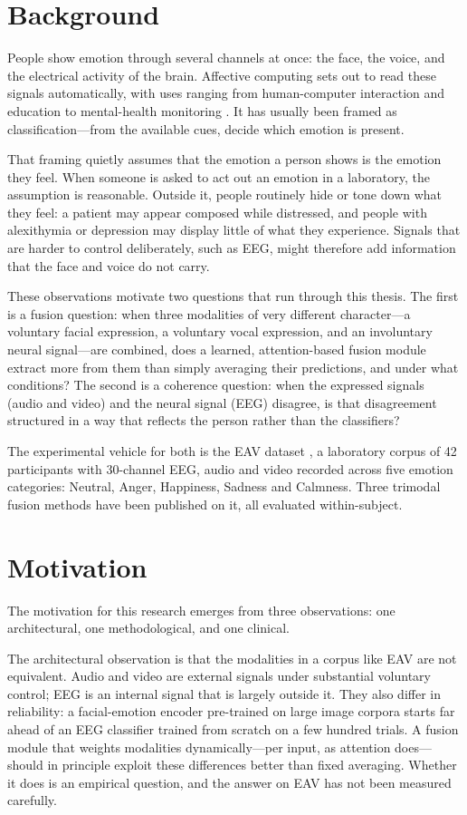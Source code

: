 \section{Background}
People show emotion through several channels at once: the face, the voice, and the electrical activity of the brain. Affective computing sets out to read these signals automatically, with uses ranging from human-computer interaction and education to mental-health monitoring \cite{Picard1997AffectiveComputing}. It has usually been framed as classification---from the available cues, decide which emotion is present.

That framing quietly assumes that the emotion a person shows is the emotion they feel. When someone is asked to act out an emotion in a laboratory, the assumption is reasonable. Outside it, people routinely hide or tone down what they feel: a patient may appear composed while distressed, and people with alexithymia or depression may display little of what they experience. Signals that are harder to control deliberately, such as EEG, might therefore add information that the face and voice do not carry.

These observations motivate two questions that run through this thesis. The first is a fusion question: when three modalities of very different character---a voluntary facial expression, a voluntary vocal expression, and an involuntary neural signal---are combined, does a learned, attention-based fusion module extract more from them than simply averaging their predictions, and under what conditions? The second is a coherence question: when the expressed signals (audio and video) and the neural signal (EEG) disagree, is that disagreement structured in a way that reflects the person rather than the classifiers?

The experimental vehicle for both is the EAV dataset \cite{Lee2024EAV}, a laboratory corpus of 42 participants with 30-channel EEG, audio and video recorded across five emotion categories: Neutral, Anger, Happiness, Sadness and Calmness. Three trimodal fusion methods have been published on it, all evaluated within-subject.

\section{Motivation}
The motivation for this research emerges from three observations: one architectural, one methodological, and one clinical.

The architectural observation is that the modalities in a corpus like EAV are not equivalent. Audio and video are external signals under substantial voluntary control; EEG is an internal signal that is largely outside it. They also differ in reliability: a facial-emotion encoder pre-trained on large image corpora starts far ahead of an EEG classifier trained from scratch on a few hundred trials. A fusion module that weights modalities dynamically---per input, as attention does---should in principle exploit these differences better than fixed averaging. Whether it does is an empirical question, and the answer on EAV has not been measured carefully.

